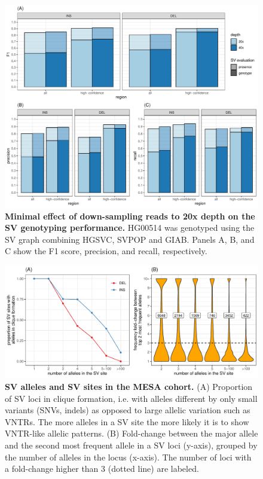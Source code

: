 \documentclass[11pt]{ucscthesis}
\begin{document}
\begin{figure}[p]
    \centering
    \includegraphics[width=.9\linewidth, page=1]{fig-sveval.pdf}
    \caption[Minimal effect of down-sampling reads to 20x depth on the SV genotyping performance]{{\bf Minimal effect of down-sampling reads to 20x depth on the SV genotyping performance.}
      HG00514 was genotyped using the SV graph combining HGSVC, SVPOP and GIAB.
      Panels A, B, and C show the F1 score, precision, and recall, respectively.
    }
    \label{fig:sveval-depth}
\end{figure}



\begin{figure}[p]
    \centering
    \includegraphics[width=.9\linewidth]{fig-sv-mesa-stats-2.pdf}
    \caption[SV alleles and SV sites in the MESA cohort]{{\bf SV alleles and SV sites in the MESA cohort.}
      (A) Proportion of SV loci in clique formation, i.e. with alleles different by only small variants (SNVs, indels) as opposed to large allelic variation such as VNTRs.
      The more alleles in a SV site the more likely it is to show VNTR-like allelic patterns.
      (B) Fold-change between the major allele and the second most frequent allele in a SV loci (y-axis), grouped by the number of alleles in the locus (x-axis).
      The number of loci with a fold-change higher than 3 (dotted line) are labeled.
    }
    \label{fig:svsites_mesa}
\end{figure}
\end{document}
